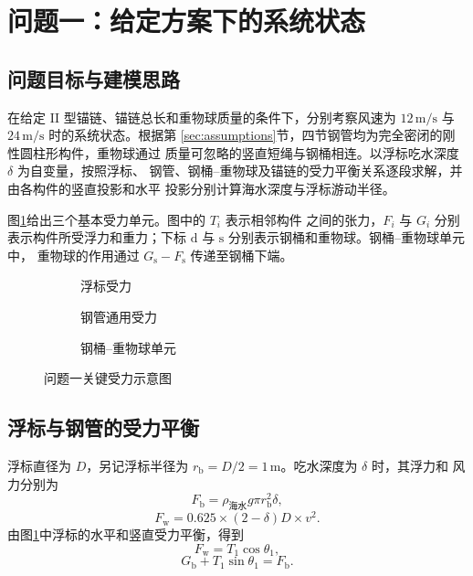 \section{问题一：给定方案下的系统状态}

\subsection{问题目标与建模思路}

在给定 II 型锚链、锚链总长和重物球质量的条件下，分别考察风速为
\(12\,\mathrm{m/s}\) 与 \(24\,\mathrm{m/s}\) 时的系统状态。根据第
\ref{sec:assumptions}节，四节钢管均为完全密闭的刚性圆柱形构件，重物球通过
质量可忽略的竖直短绳与钢桶相连。以浮标吃水深度 \(\delta\) 为自变量，按照浮标、
钢管、钢桶--重物球及锚链的受力平衡关系逐段求解，并由各构件的竖直投影和水平
投影分别计算海水深度与浮标游动半径。

图\ref{fig:q1-freebody}给出三个基本受力单元。图中的 \(T_i\) 表示相邻构件
之间的张力，\(F_i\) 与 \(G_i\) 分别表示构件所受浮力和重力；下标
\(\mathrm d\) 与 \(\mathrm s\) 分别表示钢桶和重物球。钢桶--重物球单元中，
重物球的作用通过 \(G_{\mathrm s}-F_{\mathrm s}\) 传递至钢桶下端。

\begin{figure}[H]
  \centering
  \begin{subfigure}[b]{0.30\textwidth}
    \centering
    
    \caption{浮标受力}
  \end{subfigure}\hfill
  \begin{subfigure}[b]{0.30\textwidth}
    \centering
    
    \caption{钢管通用受力}
  \end{subfigure}\hfill
  \begin{subfigure}[b]{0.30\textwidth}
    \centering
    
    \caption{钢桶--重物球单元}
  \end{subfigure}
  \caption{问题一关键受力示意图}
  \label{fig:q1-freebody}
\end{figure}

\subsection{浮标与钢管的受力平衡}

浮标直径为 \(D\)，另记浮标半径为 \(r_{\mathrm b}=D/2=1\,\mathrm m\)。吃水深度为 \(\delta\) 时，其浮力和
风力分别为
\begin{equation}
  F_{\mathrm b}=\rho_{\text{海水}}g\pi r_{\mathrm b}^{2}\delta,
  \label{eq:q1-buoyancy}
\end{equation}
\begin{equation}
  F_{\mathrm w}=0.625\times(2-\delta)D\times v^2.
  \label{eq:q1-wind-load}
\end{equation}
由图\ref{fig:q1-freebody}中浮标的水平和竖直受力平衡，得到
\begin{equation}
  F_{\mathrm w}=T_1\cos\theta_1,
  \label{eq:q1-buoy-horizontal}
\end{equation}
\begin{equation}
  G_{\mathrm b}+T_1\sin\theta_1=F_{\mathrm b}.
  \label{eq:q1-buoy-vertical}
\end{equation}

